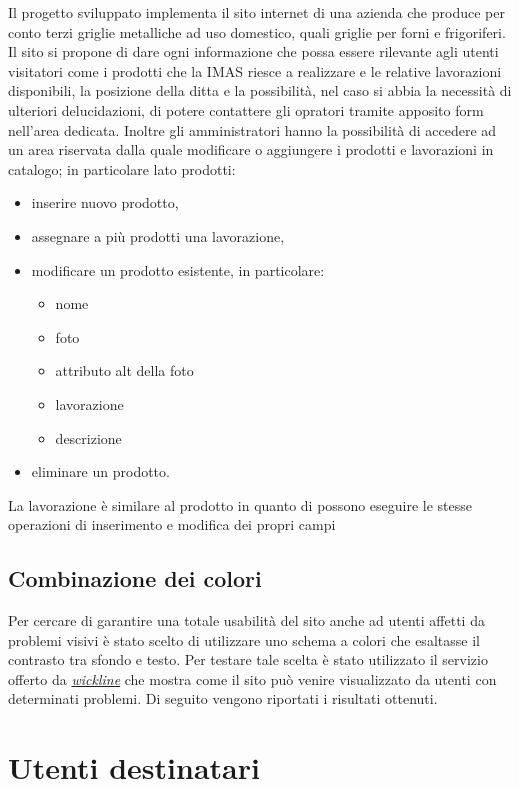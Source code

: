 \documentclass[11pt]{article}
\begin{document}
Il progetto sviluppato implementa il sito internet di una azienda che produce per conto terzi griglie metalliche ad uso domestico, quali griglie per forni e frigoriferi.
Il sito si propone di dare ogni informazione che possa essere rilevante agli utenti visitatori come i prodotti che la IMAS riesce a realizzare e le relative lavorazioni disponibili, la posizione della ditta  e la possibilità, nel caso si abbia la necessità di ulteriori delucidazioni, di potere contattere gli opratori tramite apposito form nell'area dedicata.
Inoltre gli amministratori hanno la possibilità di accedere ad un area riservata dalla quale modificare  o aggiungere i prodotti e lavorazioni in catalogo; in particolare lato prodotti:
\begin{itemize}
	\item inserire nuovo prodotto,
	\item assegnare a più prodotti una lavorazione, 
	\item modificare un prodotto esistente, in particolare:	
	\begin{itemize}
		\item nome
		\item foto
		\item attributo alt della foto
		\item lavorazione
		\item descrizione
	\end{itemize}
	\item eliminare un prodotto.
\end{itemize}
La lavorazione è similare al prodotto in quanto di possono eseguire le stesse operazioni di inserimento e modifica dei propri campi

\subsection{Combinazione dei colori}
Per cercare di garantire una totale usabilità del sito anche ad utenti affetti da problemi visivi è stato scelto di utilizzare uno schema a colori che esaltasse il contrasto tra sfondo e testo. Per testare tale scelta è stato utilizzato il servizio offerto da \href{http://colorfilter.wickline.org/}{\textit{wickline}} che mostra come il sito può venire visualizzato da utenti con determinati problemi. Di seguito vengono riportati i risultati ottenuti.
\newpage
\section{Utenti destinatari}
\end{document}
